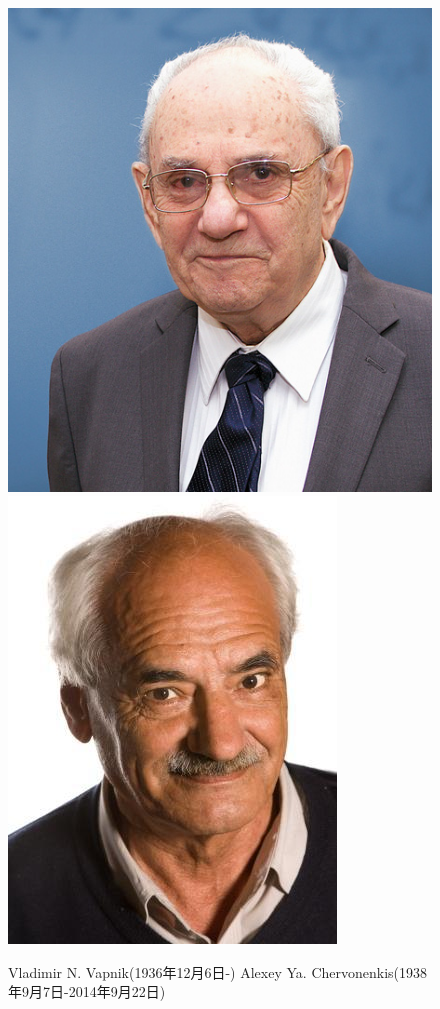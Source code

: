 \documentclass[compress,10pt,dvipsnames,notheorems]{beamer} %
\begin{document}
\begin{frame}
\begin{figure}
\centering
\includegraphics[width=.5\linewidth]{Imgs/vladimir-vapnik-456x520-1.jpg}
\includegraphics[width=.45\linewidth]{Imgs/chervonenkis_from_wiki.jpg}
\captionsetup{labelformat=empty}
\caption{Vladimir N. Vapnik(1936年12月6日-) Alexey Ya. Chervonenkis(1938年9月7日-2014年9月22日)}
\end{figure}
\end{frame}
\end{document}
